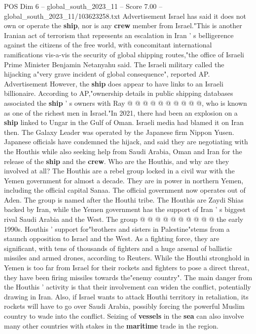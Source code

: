 \begin{textsample}{POS Dim 6 – global\_south\_2023\_11 – Score 7.00 – global\_south\_2023\_11/103623258.txt}
Advertisement Israel has said it does not own or operate the \textbf{ship}, nor is any \textbf{crew} member from Israel."This is another Iranian act of terrorism that represents an escalation in Iran ' s belligerence against the citizens of the free world, with concomitant international ramifications vis-a-vis the security of global shipping routes,"the office of Israeli Prime Minister Benjamin Netanyahu said.
The Israeli military called the hijacking a"very grave incident of global consequence", reported AP.
Advertisement However, the \textbf{ship} does appear to have links to an Israeli billionaire.
According to AP,"ownership details in public shipping databases associated the \textbf{ship} ' s owners with Ray @ @ @ @ @ @ @ @ @ @, who is known as one of the richest men in Israel."In 2021, there had been an explosion on a \textbf{ship} linked to Ungar in the Gulf of Oman.
Israeli media had blamed it on Iran then.
The Galaxy Leader was operated by the Japanese firm Nippon Yusen.
Japanese officials have condemned the hijack, and said they are negotiating with the Houthis while also seeking help from Saudi Arabia, Oman and Iran for the release of the \textbf{ship} and the \textbf{crew}.
Who are the Houthis, and why are they involved at all?
The Houthis are a rebel group locked in a civil war with the Yemen government for almost a decade.
They are in power in northern Yemen, including the official capital Sanaa.
The official government now operates out of Aden.
The group is named after the Houthi tribe.
The Houthis are Zaydi Shias backed by Iran, while the Yemen government has the support of Iran ' s biggest rival Saudi Arabia and the West.
The group @ @ @ @ @ @ @ @ @ @ the early 1990s.
Houthis ' support for"brothers and sisters in Palestine"stems from a staunch opposition to Israel and the West.
As a fighting force, they are significant, with tens of thousands of fighters and a huge arsenal of ballistic missiles and armed drones, according to Reuters.
While the Houthi stronghold in Yemen is too far from Israel for their rockets and fighters to pose a direct threat, they have been firing missiles towards the"enemy country".
The main danger from the Houthis ' activity is that their involvement can widen the conflict, potentially drawing in Iran.
Also, if Israel wants to attack Houthi territory in retaliation, its rockets will have to go over Saudi Arabia, possibly forcing the powerful Muslim country to wade into the conflict.
Seizing of \textbf{vessels} in the \textbf{sea} can also involve many other countries with stakes in the \textbf{maritime} trade in the region.

\end{textsample}
